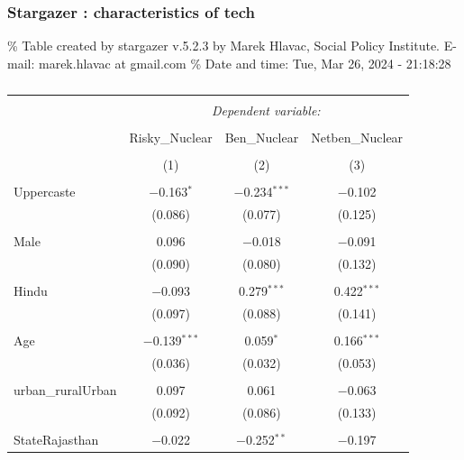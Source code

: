 \documentclass[
]{article}
\begin{document}
\newpage

\hypertarget{stargazer-characteristics-of-tech}{%
\subsubsection{Stargazer : characteristics of
tech}\label{stargazer-characteristics-of-tech}}

\begingroup\setlength{\tabcolsep}{1pt}

\renewcommand{\arraystretch}{0.7}

\% Table created by stargazer v.5.2.3 by Marek Hlavac, Social Policy
Institute. E-mail: marek.hlavac at gmail.com \% Date and time: Tue, Mar
26, 2024 - 21:18:28

\begin{table}[!htbp] \centering 
  \caption{} 
  \label{} 
\begin{tabular}{@{\extracolsep{5pt}}lccc} 
\\[-1.8ex]\hline 
\hline \\[-1.8ex] 
 & \multicolumn{3}{c}{\textit{Dependent variable:}} \\ 
\cline{2-4} 
\\[-1.8ex] & Risky\_Nuclear & Ben\_Nuclear & Netben\_Nuclear \\ 
\\[-1.8ex] & (1) & (2) & (3)\\ 
\hline \\[-1.8ex] 
 Uppercaste & $-$0.163$^{*}$ & $-$0.234$^{***}$ & $-$0.102 \\ 
  & (0.086) & (0.077) & (0.125) \\ 
  & & & \\ 
 Male & 0.096 & $-$0.018 & $-$0.091 \\ 
  & (0.090) & (0.080) & (0.132) \\ 
  & & & \\ 
 Hindu & $-$0.093 & 0.279$^{***}$ & 0.422$^{***}$ \\ 
  & (0.097) & (0.088) & (0.141) \\ 
  & & & \\ 
 Age & $-$0.139$^{***}$ & 0.059$^{*}$ & 0.166$^{***}$ \\ 
  & (0.036) & (0.032) & (0.053) \\ 
  & & & \\ 
 urban\_ruralUrban & 0.097 & 0.061 & $-$0.063 \\ 
  & (0.092) & (0.086) & (0.133) \\ 
  & & & \\ 
 StateRajasthan & $-$0.022 & $-$0.252$^{**}$ & $-$0.197 \\ 

\end{tabular}
\end{table}
\end{document}
